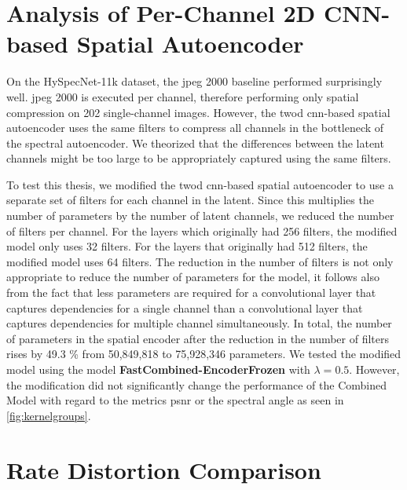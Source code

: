 \section[Analysis of Per-Channel Autoencoder]{Analysis of Per-Channel 2D CNN-based Spatial Autoencoder}
On the HySpecNet-11k dataset, the \ac{jpeg} 2000 baseline performed surprisingly well. \Ac{jpeg} 2000 is executed per channel, therefore performing only spatial compression on 202 single-channel images. However, the \ac{twod} \ac{cnn}-based spatial autoencoder uses the same filters to compress all channels in the bottleneck of the spectral autoencoder. We theorized that the differences between the latent channels might be too large to be appropriately captured using the same filters. 

To test this thesis, we modified the \ac{twod} \ac{cnn}-based spatial autoencoder to use a separate set of filters for each channel in the latent. Since this multiplies the number of parameters by the number of latent channels, we reduced the number of filters per channel. For the layers which originally had 256 filters, the modified model only uses 32 filters. For the layers that originally had 512 filters, the modified model uses 64 filters. The reduction in the number of filters is not only appropriate to reduce the number of parameters for the model, it follows also from the fact that less parameters are required for a convolutional layer that captures dependencies for a single channel than a convolutional layer that captures dependencies for multiple channel simultaneously. In total, the number of parameters in the spatial encoder after the reduction in the number of filters rises by 49.3 \% from 50,849,818 to 75,928,346 parameters. We tested the modified model using the model \textbf{FastCombined-EncoderFrozen} with $\lambda=0.5$. However, the modification did not significantly change the performance of the Combined Model with regard to the metrics \ac{psnr} or the spectral angle as seen in \autoref{fig:kernelgroups}. 

\section{Rate Distortion Comparison\label{sec:ch5heur}}

